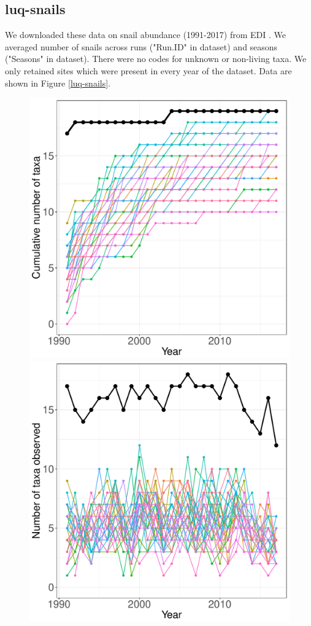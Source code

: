 \documentclass[11pt, oneside]{article}
\begin{document}
\subsection{luq-snails}
We downloaded these data on snail abundance (1991-2017) from EDI \citep{luq-snails}.
We averaged number of snails across runs ("Run.ID" in dataset) and seasons ("Seasons" in dataset). 
There were no codes for unknown or non-living taxa. We only retained sites which were present in every year of the dataset. Data are shown in Figure \ref{luq-snails}.

\begin{figure}[h!]
\centering
\includegraphics[scale = 0.4]{luq-snails-compagnoni_species_accumulation_curve.pdf}
\includegraphics[scale = 0.4]{luq-snails-compagnoni_num_taxa_over_time.pdf}

\end{figure}
\end{document}
